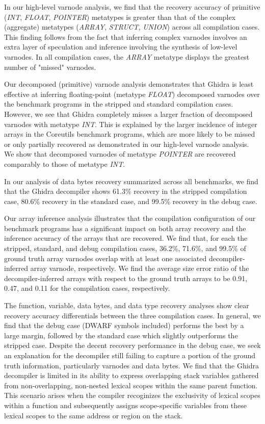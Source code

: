 \documentclass[conference]{IEEEtran}
\begin{document}
In our high-level varnode analysis, we find that the recovery accuracy of primitive (\emph{INT}, \emph{FLOAT}, \emph{POINTER}) metatypes is greater than that of the complex (aggregate) metatypes (\emph{ARRAY}, \emph{STRUCT}, \emph{UNION}) across all compilation cases. This finding follows from the fact that inferring complex varnodes involves an extra layer of speculation and inference involving the synthesis of low-level varnodes. In all compilation cases, the \emph{ARRAY} metatype displays the greatest number of "missed" varnodes.

Our decomposed (primitive) varnode analysis demonstrates that Ghidra is least effective at inferring floating-point (metatype \emph{FLOAT}) decomposed varnodes over the benchmark programs in the stripped and standard compilation cases. However, we see that Ghidra completely misses a larger fraction of decomposed varnodes with metatype \emph{INT}. This is explained by the larger incidence of integer arrays in the Coreutils benchmark programs, which are more likely to be missed or only partially recovered as demonstrated in our high-level varnode analysis. We show that decomposed varnodes of metatype \emph{POINTER} are recovered comparably to those of metatype \emph{INT}.

In our analysis of data bytes recovery summarized across all benchmarks, we find that the Ghidra decompiler shows 61.3\% recovery in the stripped compilation case, 80.6\% recovery in the standard case, and 99.5\% recovery in the debug case.

Our array inference analysis illustrates that the compilation configuration of our benchmark programs has a significant impact on both array recovery and the inference accuracy of the arrays that are recovered. We find that, for each the stripped, standard, and debug compilation cases, 36.2\%, 71.6\%, and 99.5\% of ground truth array varnodes overlap with at least one associated decompiler-inferred array varnode, respectively. We find the average size error ratio of the decompiler-inferred arrays with respect to the ground truth arrays to be 0.91, 0.47, and 0.11 for the compilation cases, respectively.

The function, variable, data bytes, and data type recovery analyses show clear recovery accuracy differentials between the three compilation cases. In general, we find that the debug case (DWARF symbols included) performs the best by a large margin, followed by the standard case which slightly outperforms the stripped case. Despite the decent recovery performance in the debug case, we seek an explanation for the decompiler still failing to capture a portion of the ground truth information, particularly varnodes and data bytes. We find that the Ghidra decompiler is limited in its ability to express overlapping stack variables gathered from non-overlapping, non-nested lexical scopes within the same parent function. This scenario arises when the compiler recoginizes the exclusivity of lexical scopes within a function and subsequently assigns scope-specific variables from these lexical scopes to the same address or region on the stack.
\end{document}

